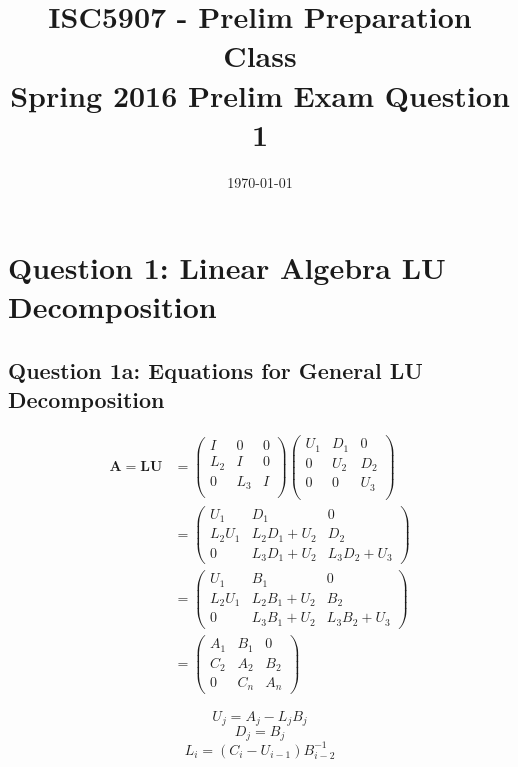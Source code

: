 \documentclass[11pt,a4paper,oneside]{article}
\begin{document}
\title{ISC5907 - Prelim Preparation Class \\ 
	 Spring 2016 Prelim Exam Question 1}
\date{\today}
\maketitle

\section{Question 1: Linear Algebra LU Decomposition}
\subsection{Question 1a: Equations for General LU Decomposition}
\begin{align}
{\mathbf{A=LU}} & =
\begin{pmatrix}   I & 0 & 0 \\
   L_2 & I & 0 \\
   0 & L_3 & I \\
\end{pmatrix}
\begin{pmatrix}   U_1 & D_1 & 0 \\
   0 & U_2 & D_2 \\
   0 & 0 & U_3\\
\end{pmatrix} \\
& = \begin{pmatrix}
		U_1 & D_1 & 0 \\
		L_2 U_1 & L_2 D_1 + U_2 & D_2 \\
		0 & L_3 D_1 + U_2 & L_3 D_2 + U_3
\end{pmatrix} \\
& = \begin{pmatrix}
		U_1 & B_1 & 0 \\
		L_2 U_1 & L_2 B_1 + U_2 & B_2 \\
		0 & L_3 B_1 + U_2 & L_3 B_2 + U_3
\end{pmatrix} \\
& = \begin{pmatrix}
	A_1 & B_1 & 0 \\
	C_2 & A_2 & B_2 \\
	0   & C_n & A_n
\end{pmatrix}
\end{align}
	
\begin{equation}
U_j = A_j - L_j B_j
\end{equation}
\begin{equation} 
D_j = B_j
\end{equation}
\begin{equation}
L_{i} = (C_i - U_{i-1}) B_{i-2}^{-1}
\end{equation}
\end{document}
